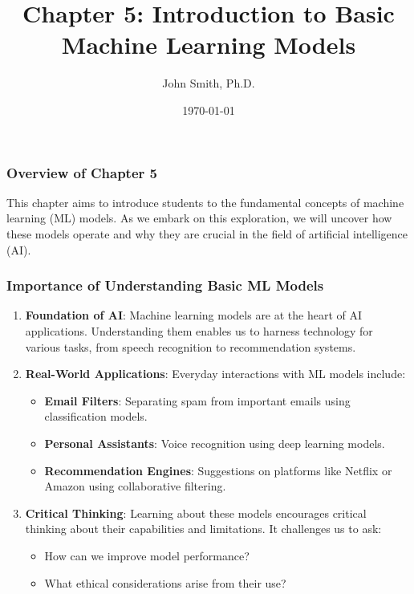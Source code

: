 \documentclass[aspectratio=169]{beamer}
\title[Introduction to Basic ML Models]{Chapter 5: Introduction to Basic Machine Learning Models}
\author[J. Smith]{John Smith, Ph.D.}
\institute[University Name]{
  Department of Computer Science\\
  University Name\\
  \vspace{0.3cm}
  Email: email@university.edu\\
  Website: www.university.edu
}
\date{\today}
\begin{document}
\frame{\titlepage}

\begin{frame}[fragile]
    \titlepage
\end{frame}

\begin{frame}[fragile]
    \frametitle{Overview of Chapter 5}
    This chapter aims to introduce students to the fundamental concepts of machine learning (ML) models. 
    As we embark on this exploration, we will uncover how these models operate and why they are crucial in the field of artificial intelligence (AI).
\end{frame}

\begin{frame}[fragile]
    \frametitle{Importance of Understanding Basic ML Models}
    \begin{enumerate}
        \item \textbf{Foundation of AI}: 
        Machine learning models are at the heart of AI applications. Understanding them enables us to harness technology for various tasks, from speech recognition to recommendation systems.

        \item \textbf{Real-World Applications}:
        Everyday interactions with ML models include:
        \begin{itemize}
            \item \textbf{Email Filters}: Separating spam from important emails using classification models.
            \item \textbf{Personal Assistants}: Voice recognition using deep learning models.
            \item \textbf{Recommendation Engines}: Suggestions on platforms like Netflix or Amazon using collaborative filtering.
        \end{itemize}

        \item \textbf{Critical Thinking}:
        Learning about these models encourages critical thinking about their capabilities and limitations. It challenges us to ask:
        \begin{itemize}
            \item How can we improve model performance?
            \item What ethical considerations arise from their use?
        \end{itemize}


\end{enumerate}
\end{frame}
\end{document}
